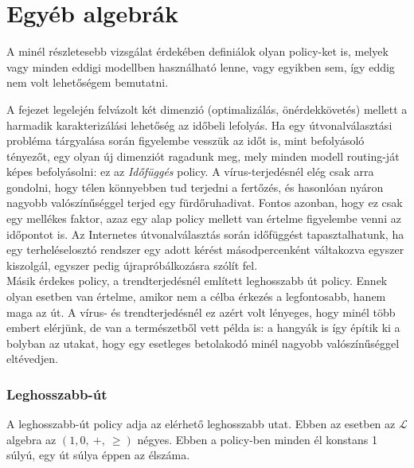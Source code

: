   \section{Egyéb algebrák}
  A minél részletesebb vizsgálat érdekében definiálok olyan policy-ket is, melyek vagy minden eddigi modellben használható lenne, vagy egyikben sem, így eddig nem volt lehetőségem bemutatni.

  A fejezet legelején felvázolt két dimenzió (optimalizálás, önérdekkövetés) mellett a harmadik karakterizálási lehetőség az időbeli lefolyás. Ha egy útvonalválasztási probléma tárgyalása során figyelembe vesszük az időt is, mint befolyásoló tényezőt, egy olyan új dimenziót ragadunk meg, mely minden modell routing-ját képes befolyásolni: ez az \textit{Időfüggés} policy. A vírus-terjedésnél elég csak arra gondolni, hogy télen könnyebben tud terjedni a fertőzés, és hasonlóan nyáron nagyobb valószínűséggel terjed egy fürdőruhadivat. Fontos azonban, hogy ez csak egy mellékes faktor, azaz egy alap policy mellett van értelme figyelembe venni az időpontot is. Az Internetes útvonalválasztás során időfüggést tapasztalhatunk, ha egy terheléselosztó rendszer egy adott kérést másodpercenként váltakozva egyszer kiszolgál, egyszer pedig újrapróbálkozásra szólít fel.\\

  Másik érdekes policy, a trendterjedésnél említett leghosszabb út policy. Ennek olyan esetben van értelme, amikor nem a célba érkezés a legfontosabb, hanem maga az út. A vírus- és trendterjedésnél ez azért volt lényeges, hogy minél több embert elérjünk, de van a természetből vett példa is: a hangyák is így építik ki a bolyban az utakat, hogy egy esetleges betolakodó minél nagyobb valószínűséggel eltévedjen.

      \subsubsection{Leghosszabb-út}
      A leghosszabb-út policy adja az elérhető leghosszabb utat. Ebben az esetben az $\mathcal{L}$ algebra az $(1, 0,~+,~\geq)$ négyes. Ebben a policy-ben minden él konstans 1 súlyú, egy út súlya éppen az élszáma.

